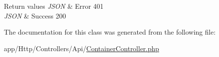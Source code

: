 \begin{DoxyRetVals}{Return values}
{\em J\+S\+ON} & Error 401 \\
\hline
{\em J\+S\+ON} & Success 200 \\
\hline
\end{DoxyRetVals}


The documentation for this class was generated from the following file\+:\begin{DoxyCompactItemize}
\item 
app/\+Http/\+Controllers/\+Api/\mbox{\hyperlink{_container_controller_8php}{Container\+Controller.\+php}}\end{DoxyCompactItemize}
